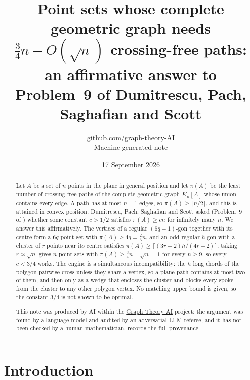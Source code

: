 \documentclass[11pt,a4paper]{article}
\title{Point sets whose complete geometric graph needs $\tfrac34 n-O(\sqrt n)$ crossing-free paths:\\ an affirmative answer to Problem~9 of Dumitrescu, Pach, Saghafian and Scott}
\author{\href{https://github.com/graph-theory-AI}{github.com/graph-theory-AI}\\[2pt] \normalsize Machine-generated note}
\date{17 September 2026}
\theoremstyle{plain}
\theoremstyle{definition}
\theoremstyle{remark}
\newcommand{\pipath}{\pi}
\begin{document}
\maketitle

\begin{abstract}
Let $A$ be a set of $n$ points in the plane in general position and let $\pipath(A)$ be the least number of crossing-free paths of the complete geometric graph $K_n[A]$ whose union contains every edge. A path has at most $n-1$ edges, so $\pipath(A)\ge\lceil n/2\rceil$, and this is attained in convex position. Dumitrescu, Pach, Saghafian and Scott asked (Problem~9 of \cite{DPSS26}) whether some constant $c>1/2$ satisfies $\pipath(A)\ge cn$ for infinitely many $n$. We answer this affirmatively. The vertices of a regular $(6q-1)$-gon together with its centre form a $6q$-point set with $\pipath(A)\ge 4q=\tfrac23 n$, and an odd regular $h$-gon with a cluster of $r$ points near its centre satisfies $\pipath(A)\ge\lceil (3r-2)h/(4r-2)\rceil$; taking $r\approx\sqrt n$ gives $n$-point sets with $\pipath(A)\ge\tfrac34 n-\sqrt n-1$ for every $n\ge9$, so every $c<3/4$ works. The engine is a simultaneous incompatibility: the $h$ long chords of the polygon pairwise cross unless they share a vertex, so a plane path contains at most two of them, and then only as a wedge that encloses the cluster and blocks every spoke from the cluster to any other polygon vertex. No matching upper bound is given, so the constant $3/4$ is not shown to be optimal.

\medskip\noindent\small
This note was produced by AI within the \href{https://github.com/graph-theory-AI/Graph-Theory-LLM-Proofs}{Graph Theory AI} project:
the argument was found by a language model and audited by an adversarial LLM
referee, and it has not been checked by a human mathematician.
 records the full provenance.
\end{abstract}

\section{Introduction}
\end{document}
